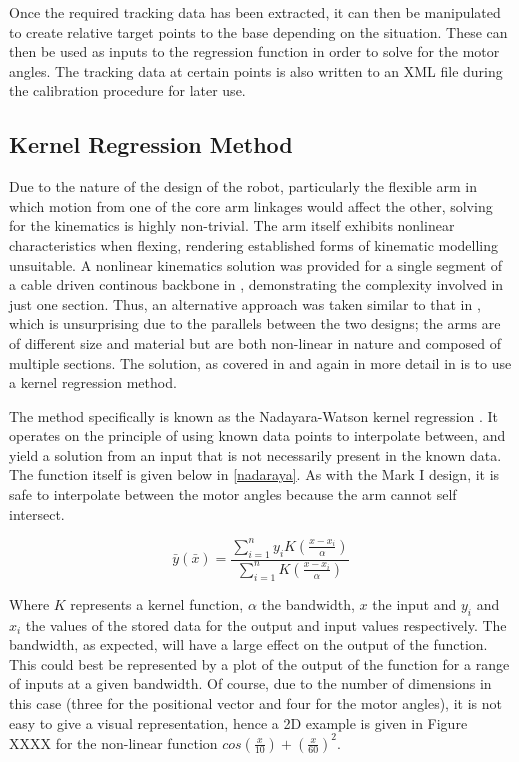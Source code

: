 \documentclass[11pt]{article}
\begin{document}
Once the required tracking data has been extracted, it can then be manipulated to create relative target points to the base depending on the situation. These can then be used as inputs to the regression function in order to solve for the motor angles. The tracking data at certain points is also written to an XML file during the calibration procedure for later use.

\subsection{Kernel Regression Method}
Due to the nature of the design of the robot, particularly the flexible arm in which motion from one of the core arm linkages would affect the other, solving for the kinematics is highly non-trivial. The arm itself exhibits nonlinear characteristics when flexing, rendering established forms of kinematic modelling unsuitable. A nonlinear kinematics solution was provided for a single segment of a cable driven continous backbone in \cite{li2002}, demonstrating the complexity involved in just one section. Thus, an alternative approach was taken similar to that in \cite{GreggSmithDesign}, which is unsurprising due to the parallels between the two designs; the arms are of different size and material but are both non-linear in nature and composed of multiple sections. The solution, as covered in \cite{GreggSmithDesign} and again in more detail in \cite{GreggSmithPhd} is to use a kernel regression method.

The method specifically is known as the Nadayara-Watson kernel regression \cite{nadaraya1964}. It operates on the principle of using known data points to interpolate between, and yield a solution from an input that is not necessarily present in the known data. The function itself is given below in \eqref{nadaraya}. As with the Mark I design, it is safe to interpolate between the motor angles because the arm cannot self intersect.

\begin{equation}\label{nadaraya}
\bar{y}(\bar{x}) = \frac{\sum_{i=1}^{n}y_{i}K(\frac{x - x_{i}}{\alpha})}{\sum_{i=1}^{n}K(\frac{x - x_{i}}{\alpha})}
\end{equation}

Where $K$ represents a kernel function, $\alpha$ the bandwidth, $x$ the input and $y_{i}$ and $x_{i}$ the values of the stored data for the output and input values respectively. The bandwidth, as expected, will have a large effect on the output of the function. This could best be represented by a plot of the output of the function for a range of inputs at a given bandwidth. Of course, due to the number of dimensions in this case (three for the positional vector and four for the motor angles), it is not easy to give a visual representation, hence a 2D example is given in Figure XXXX for the non-linear  function $cos(\frac{x}{10}) + (\frac{x}{60})^2$. 
\end{document}
